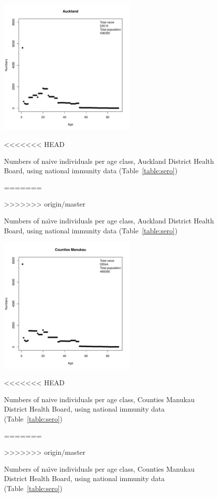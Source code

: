 \documentclass{article}
\begin{document}
\begin{itemize}
\begin{figure}[H]
     \begin{center}
     \includegraphics[width=0.6\textwidth]{dhb3.pdf}
     \end{center}
<<<<<<< HEAD
     \caption{Numbers of naive individuals per age class, Auckland District Health Board, using national immunity data (Table~\ref{table:sero})}
=======
     \caption{Numbers of na\"{\i}ve individuals per age class, Auckland District Health Board, using national immunity data (Table~\ref{table:sero})}
>>>>>>> origin/master
     \label{fig:Auckland}
\end{figure}

\begin{figure}[H]
     \begin{center}
     \includegraphics[width=0.6\textwidth]{dhb4.pdf}
     \end{center}
<<<<<<< HEAD
     \caption{Numbers of naive individuals per age class, Counties Manukau District Health Board, using national immunity data (Table~\ref{table:sero})}
=======
     \caption{Numbers of na\"{\i}ve individuals per age class, Counties Manukau District Health Board, using national immunity data (Table~\ref{table:sero})}
>>>>>>> origin/master
     \label{fig:Counties_Manukau}
\end{figure}


\end{itemize}
\end{document}
